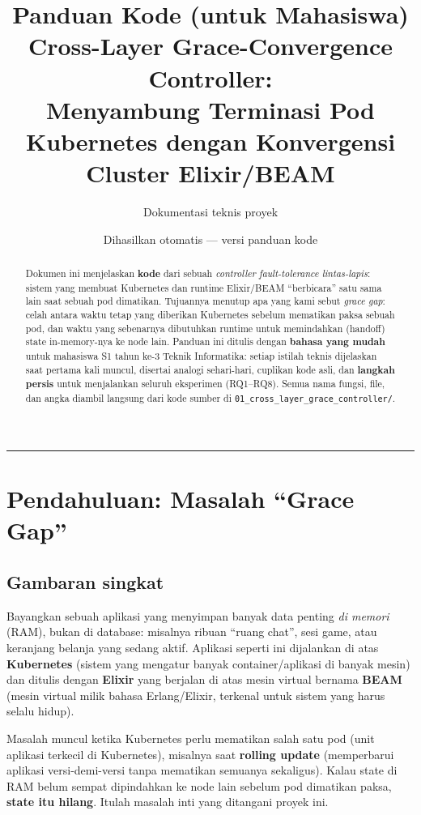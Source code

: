 \documentclass[11pt]{article}
\title{\textbf{Panduan Kode (untuk Mahasiswa)}\\[4pt]
\large Cross-Layer Grace-Convergence Controller:\\
Menyambung Terminasi Pod Kubernetes dengan Konvergensi Cluster Elixir/BEAM}
\author{Dokumentasi teknis proyek \code{01\_cross\_layer\_grace\_controller}}
\date{Dihasilkan otomatis --- versi panduan kode}
\newcommand{\code}[1]{\texttt{\small #1}}
\newcommand{\istilah}[1]{\textbf{#1}}
\begin{document}
\maketitle

\begin{abstract}
\noindent
Dokumen ini menjelaskan \textbf{kode} dari sebuah \emph{controller fault-tolerance lintas-lapis}:
sistem yang membuat Kubernetes dan runtime Elixir/BEAM ``berbicara'' satu sama lain saat sebuah pod
dimatikan. Tujuannya menutup apa yang kami sebut \emph{grace gap}: celah antara waktu tetap yang
diberikan Kubernetes sebelum mematikan paksa sebuah pod, dan waktu yang sebenarnya dibutuhkan runtime
untuk memindahkan (handoff) state in-memory-nya ke node lain. Panduan ini ditulis dengan
\textbf{bahasa yang mudah} untuk mahasiswa S1 tahun ke-3 Teknik Informatika: setiap istilah teknis
dijelaskan saat pertama kali muncul, disertai analogi sehari-hari, cuplikan kode asli, dan
\textbf{langkah persis} untuk menjalankan seluruh eksperimen (RQ1--RQ8). Semua nama fungsi, file, dan
angka diambil langsung dari kode sumber di
\code{01\_cross\_layer\_grace\_controller/}.
\end{abstract}

\tableofcontents
\bigskip
\hrule
\bigskip

\section{Pendahuluan: Masalah ``Grace Gap''}
\label{sec:intro}

\subsection{Gambaran singkat}
Bayangkan sebuah aplikasi yang menyimpan banyak data penting \emph{di memori} (RAM), bukan di
database: misalnya ribuan ``ruang chat'', sesi game, atau keranjang belanja yang sedang aktif. Aplikasi
seperti ini dijalankan di atas \istilah{Kubernetes} (sistem yang mengatur banyak container/aplikasi di
banyak mesin) dan ditulis dengan \istilah{Elixir} yang berjalan di atas mesin virtual bernama
\istilah{BEAM} (mesin virtual milik bahasa Erlang/Elixir, terkenal untuk sistem yang harus selalu
hidup).

Masalah muncul ketika Kubernetes perlu mematikan salah satu pod (unit aplikasi terkecil di
Kubernetes), misalnya saat \istilah{rolling update} (memperbarui aplikasi versi-demi-versi tanpa
mematikan semuanya sekaligus). Kalau state di RAM belum sempat dipindahkan ke node lain sebelum pod
dimatikan paksa, \textbf{state itu hilang}. Itulah masalah inti yang ditangani proyek ini.
\end{document}
